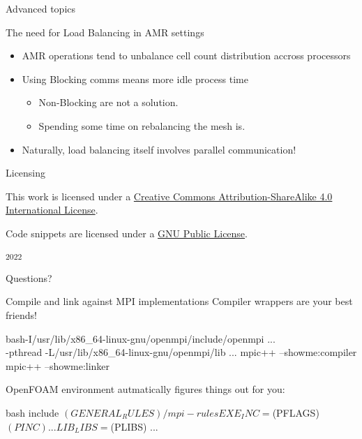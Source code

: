
\begin{frame}{Advanced topics}

    The need for Load Balancing in AMR settings

    \begin{itemize}
        \item AMR operations tend to unbalance cell count distribution accross processors
        \item Using Blocking comms means more idle process time
            \begin{itemize}
                \item Non-Blocking are not a solution.
                \item Spending some time on rebalancing the mesh is.
            \end{itemize}
        \item Naturally, load balancing itself involves parallel communication!
    \end{itemize}
\end{frame}

\begin{frame}{Licensing}

    This work is licensed under a
    \href{http://creativecommons.org/licenses/by-sa/4.0/}{Creative Commons
    Attribution-ShareAlike 4.0 International License}.

    Code snippets are licensed under a \href{http://www.gnu.org/licenses/gpl.txt}{GNU Public License}.

    \begin{center}\ccbysa \hspace{2mm} \textsuperscript{2022}\end{center}

\end{frame}

\begin{frame}[standout]
  Questions?
\end{frame}

\appendix

\begin{frame}[fragile]{Compile and link against MPI implementations}
Compiler wrappers are your best friends!
\begin{CodeEnv}{bash}{\tiny-I/usr/lib/x86\_64-linux-gnu/openmpi/include/openmpi ...\\-pthread -L/usr/lib/x86\_64-linux-gnu/openmpi/lib ...}{\scriptsize}
mpic++ --showme:compiler
mpic++ --showme:linker
\end{CodeEnv}

OpenFOAM environment autmatically figures things out for you:
\begin{CodeEnvNoComment}{bash}{\scriptsize}
include $(GENERAL_RULES)/mpi-rules
EXE_INC = $(PFLAGS) $(PINC) ...
LIB_LIBS = $(PLIBS) ...
\end{CodeEnvNoComment}
\end{frame}


